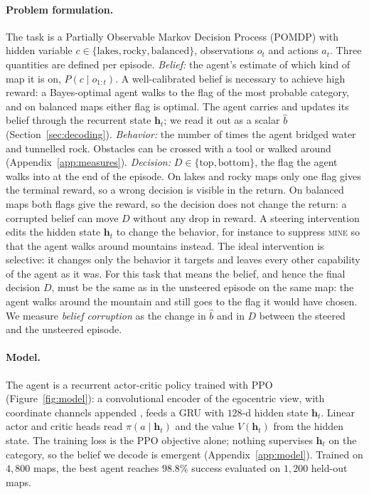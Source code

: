 \paragraph{Problem formulation.}
\label{sec:formulation}
The task is a Partially Observable Markov Decision Process (POMDP) with hidden
variable $c\in\{\text{lakes},\text{rocky},\text{balanced}\}$, observations
$o_t$ and actions $a_t$. Three quantities are defined per episode.
\emph{Belief:} the agent's estimate of which kind of map it is on,
$P(c\mid o_{1:t})$. A well-calibrated belief is necessary to achieve high reward: a
Bayes-optimal agent walks to the flag of the most probable category,
and on balanced maps either flag is optimal.
The agent carries and updates its belief through the recurrent state
$\mathbf{h}_t$; we read it out as a scalar $\hat b$ (Section~\ref{sec:decoding}).
\emph{Behavior:} the number of times the agent bridged water and tunnelled
rock. Obstacles can be crossed with a tool or walked around (Appendix~\ref{app:measures}).
\emph{Decision:} $D\in\{\text{top},\text{bottom}\}$, the flag the agent
walks into at the end of the episode. On lakes and rocky maps only one flag
gives the terminal reward, so a wrong decision is visible in the return. On
balanced maps both flags give the reward, so the decision does not change the
return: a corrupted belief can move $D$ without any drop in reward.
A steering intervention edits the hidden state $\mathbf{h}_t$ to change the
behavior, for instance to suppress \textsc{mine} so that the agent walks
around mountains instead. The ideal intervention is selective: it changes
only the behavior it targets and leaves every other capability of the agent
as it was. For this task that means the belief, and hence the final decision
$D$, must be the same as in the unsteered episode on the same map: the agent
walks around the mountain and still goes to the flag it would have chosen. We
measure \emph{belief corruption} as the change in $\hat b$ and in $D$ between
the steered and the unsteered episode.

\paragraph{Model.}
\label{sec:model}
The agent is a recurrent actor-critic policy trained with PPO
\citep{schulman2017ppo} (Figure~\ref{fig:model}): a convolutional encoder of the egocentric view, with
coordinate channels appended \citep{liu2018intriguing}, feeds a GRU \citep{cho2014gru} with $128$-d hidden state $\mathbf{h}_t$. Linear actor
and critic heads read $\pi(a\mid\mathbf{h}_t)$ and the value $V(\mathbf{h}_t)$ from the hidden state. The
training loss is the PPO objective alone; nothing supervises $\mathbf{h}_t$ on
the category, so the belief we decode is emergent (Appendix~\ref{app:model}). Trained on $4{,}800$ maps, the best
agent reaches $98.8\%$ success evaluated on $1{,}200$ held-out maps.

